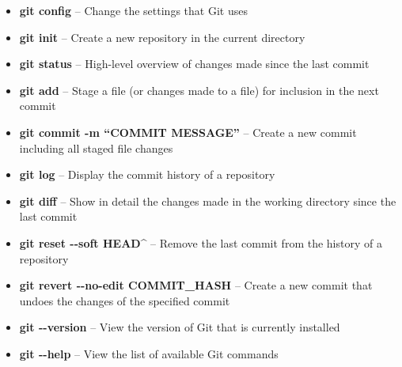 \documentclass[9pt]{extarticle}
\def\itempad{-1pt}
\begin{document}
\begin{navybox}[title=Git Command Cheat Sheet]
  \begin{itemize}
    \itemsep\itempad
  \item \textbf{git config} -- Change the settings that Git uses
  \item \textbf{git init} -- Create a new repository in the current directory
  \item \textbf{git status} -- High-level overview of changes made since the last
    commit
  \item \textbf{git add} -- Stage a file (or changes made to a file) for
    inclusion in the next commit
  \item \textbf{git commit -m ``COMMIT MESSAGE''} -- Create a new commit
    including all staged file changes
  \item \textbf{git log} -- Display the commit history of a repository
  \item \textbf{git diff} -- Show in detail the changes made in the working
    directory since the last commit
  \item \textbf{git reset -{}-soft HEAD\^} -- Remove the last commit from the
    history of a repository
  \item \textbf{git revert -{}-no-edit COMMIT\_HASH} -- Create a new commit that
    undoes the changes of the specified commit
  \item \textbf{git -{}-version} -- View the version of Git that is currently
    installed
  \item \textbf{git -{}-help} -- View the list of available Git commands

  \end{itemize}
\end{navybox}


\furtherhelp
\end{document}
